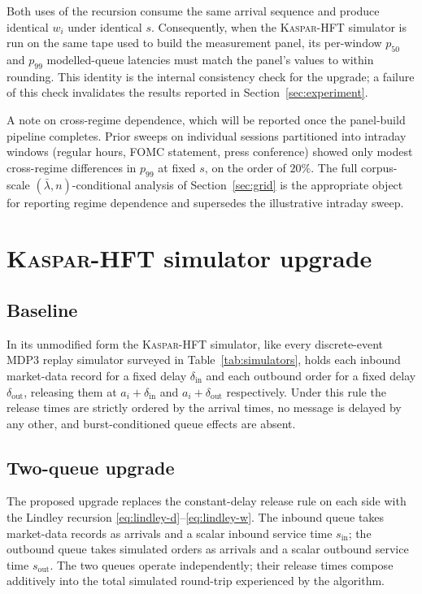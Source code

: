 \documentclass[11pt]{article}
\newcommand{\kasparhft}{\textsc{Kaspar-HFT}}
\begin{document}
Both uses of the recursion consume the same arrival sequence and produce identical $w_i$ under identical $s$. Consequently, when the \kasparhft{} simulator is run on the same tape used to build the measurement panel, its per-window $p_{50}$ and $p_{99}$ modelled-queue latencies must match the panel's values to within rounding. This identity is the internal consistency check for the upgrade; a failure of this check invalidates the results reported in Section~\ref{sec:experiment}.

A note on cross-regime dependence, which will be reported once the panel-build pipeline completes. Prior sweeps on individual sessions partitioned into intraday windows (regular hours, FOMC statement, press conference) showed only modest cross-regime differences in $p_{99}$ at fixed $s$, on the order of $20\%$. The full corpus-scale $(\bar\lambda, n)$-conditional analysis of Section~\ref{sec:grid} is the appropriate object for reporting regime dependence and supersedes the illustrative intraday sweep.

\section{\kasparhft{} simulator upgrade}
\label{sec:upgrade}

\subsection{Baseline}
\label{sec:upgrade-baseline}

In its unmodified form the \kasparhft{} simulator, like every discrete-event MDP3 replay simulator surveyed in Table~\ref{tab:simulators}, holds each inbound market-data record for a fixed delay $\delta_{\mathrm{in}}$ and each outbound order for a fixed delay $\delta_{\mathrm{out}}$, releasing them at $a_i + \delta_{\mathrm{in}}$ and $a_i + \delta_{\mathrm{out}}$ respectively. Under this rule the release times are strictly ordered by the arrival times, no message is delayed by any other, and burst-conditioned queue effects are absent.

\subsection{Two-queue upgrade}
\label{sec:upgrade-two-queue}

The proposed upgrade replaces the constant-delay release rule on each side with the Lindley recursion \eqref{eq:lindley-d}--\eqref{eq:lindley-w}. The inbound queue takes market-data records as arrivals and a scalar inbound service time $s_{\mathrm{in}}$; the outbound queue takes simulated orders as arrivals and a scalar outbound service time $s_{\mathrm{out}}$. The two queues operate independently; their release times compose additively into the total simulated round-trip experienced by the algorithm.
\end{document}
